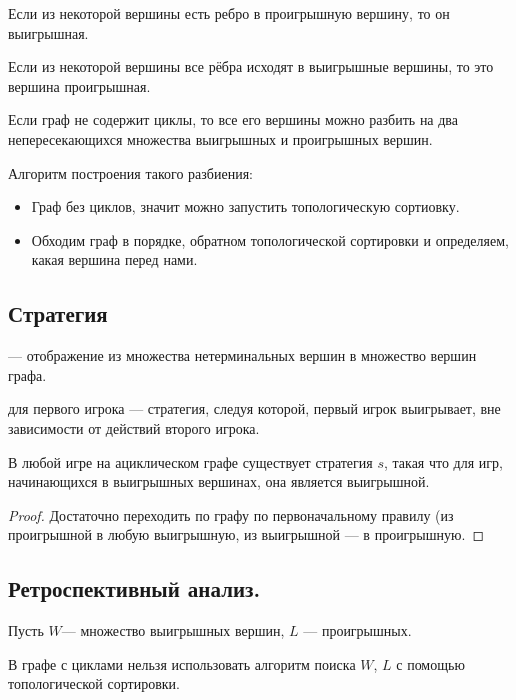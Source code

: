 \begin{remark}
  Если из некоторой вершины есть ребро в проигрышную вершину, то он выигрышная.
\end{remark}
\begin{remark}
  Если из некоторой вершины все рёбра исходят в выигрышные вершины, то это вершина проигрышная.
\end{remark}
\begin{remark}
  Если граф не содержит циклы, то все его вершины можно разбить на два непересекающихся множества 
  выигрышных и проигрышных вершин.
\end{remark}

Алгоритм построения такого разбиения:
\begin{itemize}
  \item Граф без циклов, значит можно запустить топологическую сортиовку.
  \item Обходим граф в порядке, обратном топологической сортировки и определяем, какая вершина перед нами.
\end{itemize}

\subsection{Стратегия}
\begin{definition}
   --- отображение из множества нетерминальных вершин в множество вершин графа.
\end{definition}
\begin{definition}
   для первого игрока --- стратегия, следуя которой, первый игрок
  выигрывает, вне зависимости от действий второго игрока.
\end{definition}

\begin{remark}
  В любой игре на ациклическом графе существует стратегия $s$, такая что для игр, начинающихся в
  выигрышных вершинах, она является выигрышной.
\end{remark}
\begin{proof}
  Достаточно переходить по графу по первоначальному правилу (из проигрышной в любую выигрышную, 
  из выигрышной --- в проигрышную.
\end{proof}

\subsection{Ретроспективный анализ.}
Пусть $W$--- множество выигрышных вершин, $L$ --- проигрышных.
\begin{remark}
  В графе с циклами нельзя использовать алгоритм поиска $W$, $L$ с помощью топологической сортировки.
\end{remark}

